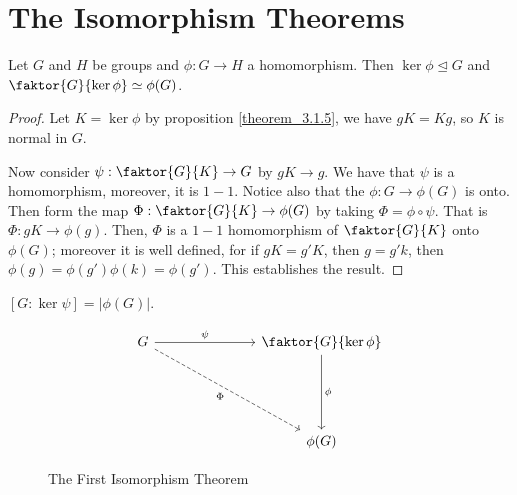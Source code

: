 \section{The Isomorphism Theorems}
\label{section_3.4}

\begin{theorem}\label{theorem_3.4.1}
  Let $G$ and  $H$ be groups and  $\phi:G \rightarrow H$ a homomorphism. Then
  $\ker{\phi} \unlhd G$ and $\faktor{G}{\ker{\phi}} \simeq \phi(G)$.
\end{theorem}
\begin{proof}
  Let $K=\ker{\phi}$ by proposition \ref{theorem_3.1.5}, we have $gK=Kg$, so  $K$ is
  normal in  $G$.

  Now consider $\psi:\faktor{G}{K} \rightarrow G$ by $gK \rightarrow g$. We
  have that $\psi$ is a homomorphism, moreover, it is $1-1$. Notice also that
  the $\phi:G \rightarrow \phi(G)$ is onto. Then form the map
  $\Phi:\faktor{G}{K} \rightarrow \phi(G)$ by taking $\Phi = \phi \circ \psi$.
  That is  $\Phi:gK \rightarrow \phi(g)$. Then, $\Phi$ is a $1-1$ homomorphism
  of  $\faktor{G}{K}$ onto $\phi(G)$; moreover it is well defined, for if
  $gK=g'K$, then  $g=g'k$, then  $\phi(g)=\phi(g')\phi(k)=\phi(g')$. This
  establishes the result.
\end{proof}
\begin{corollary}
  $[G : \ker{\psi}] = |\phi(G)|$.
\end{corollary}
\begin{figure}[h]
  \[\begin{tikzcd}
    G &&& {\faktor{G}{\ker{\phi}}} \\
    \\
    \\
      &&& {\phi(G)}
      \arrow["\psi", from=1-1, to=1-4]
      \arrow["\phi", from=1-4, to=4-4]
      \arrow["\Phi"', dashed, from=1-1, to=4-4]
  \end{tikzcd}\]
  \caption{The First Isomorphism Theorem}
  \label{fig_3.2}
\end{figure}

